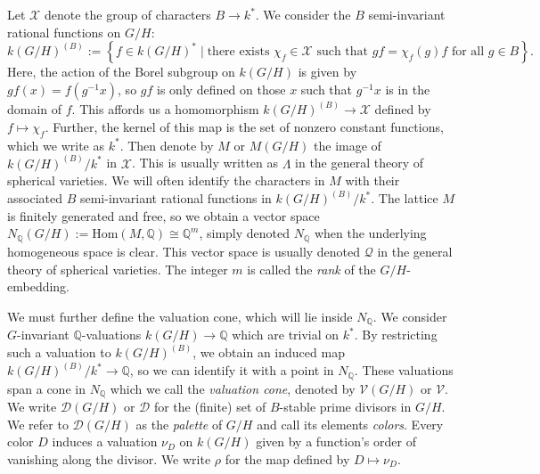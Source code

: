 \documentclass[12pt,twoside,cd]{amsart}
\theoremstyle{definition}
\begin{document}
Let $\mathcal{X}$ denote the group of characters $B \rightarrow k^*$.
We consider the $B$ semi-invariant rational functions on $G/H$:
\[
k(G/H)^{(B)} := {\left\lbrace {f \in k(G/H)^\ast \mid \text{there exists } \chi_f \in \mathcal{X} \text{ such that } gf = \chi_f(g)f \text{ for all } g \in B } \right\rbrace}.
\]
Here, the action of the Borel subgroup on $k(G/H)$ is given by $gf(x) = f(g^{-1}x)$, so $gf$ is only defined on those $x$ such that $g^{-1}x$ is in the domain of $f$.
This affords us a homomorphism $k(G/H)^{(B)} \rightarrow \mathcal{X}$ defined by $f \mapsto \chi_f$.
Further, the kernel of this map is the set of nonzero constant functions, which we write as $k^\ast$.
Then denote by $M$ or $M(G/H)$ the image of $k(G/H)^{(B)}/k^\ast$ in $\mathcal{X}$.
This is usually written as $\Lambda$ in the general theory of spherical varieties.
We will often identify the characters in $M$ with their associated $B$ semi-invariant rational functions in $k(G/H)^{(B)}/k^\ast$.
The lattice $M$ is finitely generated and free, so we obtain a vector space $N_\mathbb{Q}(G/H) := \text{Hom}(M, \mathbb{Q}) \cong \mathbb{Q}^m$, simply denoted $N_\mathbb{Q}$ when the underlying homogeneous space is clear.
This vector space is usually denoted $\mathcal{Q}$ in the general theory of spherical varieties.
The integer $m$ is called the \emph{rank} of the $G/H$-embedding.

We must further define the valuation cone, which will lie inside $N_\mathbb{Q}$. We consider $G$-invariant $\mathbb{Q}$-valuations $k(G/H) \rightarrow \mathbb{Q}$ which are trivial on $k^\ast$. 
By restricting such a valuation to $k(G/H)^{(B)}$, we obtain an induced map $k(G/H)^{(B)}/k^\ast \rightarrow \mathbb{Q}$, so we can identify it with a point in $N_\mathbb{Q}$.
These valuations span a cone in $N_\mathbb{Q}$ which we call the \emph{valuation cone}, denoted by $\mathcal{V}(G/H)$ or $\mathcal{V}$.
We write $\mathcal{D}(G/H)$ or $\mathcal{D}$ for the (finite) set of $B$-stable prime divisors in $G/H$. We refer to $\mathcal{D}(G/H)$ as the \emph{palette} of $G/H$ and call its elements \emph{colors}.
Every color $D$ induces a valuation $\nu_D$ on $k(G/H)$ given by a function's order of vanishing along the divisor.
We write $\rho$ for the map defined by $D \mapsto \nu_D$.
\end{document}
